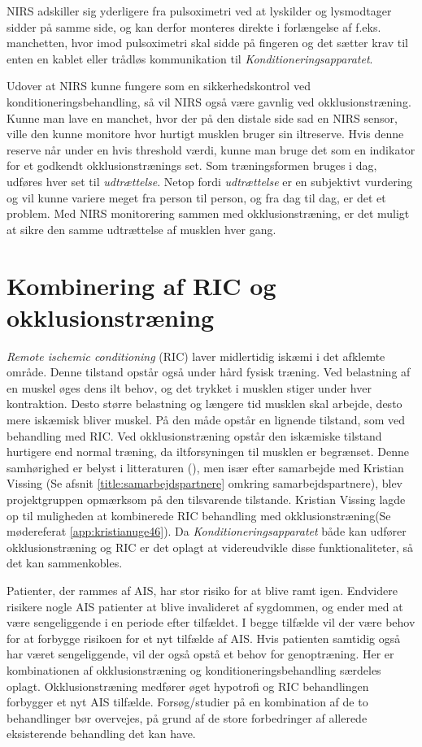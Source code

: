 NIRS adskiller sig yderligere fra pulsoximetri ved at lyskilder og lysmodtager sidder på samme side, og kan derfor monteres direkte i forlængelse af f.eks. manchetten, hvor imod pulsoximetri skal sidde på fingeren og det sætter krav til enten en kablet eller trådløs kommunikation til \textit{Konditioneringsapparatet}. 

Udover at NIRS kunne fungere som en sikkerhedskontrol ved konditioneringsbehandling, så vil NIRS også være gavnlig ved okklusionstræning. Kunne man lave en manchet, hvor der på den distale side sad en NIRS sensor, ville den kunne monitore hvor hurtigt musklen bruger sin iltreserve. Hvis denne reserve når under en hvis threshold værdi, kunne man bruge det som en indikator for et godkendt okklusionstrænings set. Som træningsformen bruges i dag, udføres hver set til \textit{udtrættelse}. Netop fordi \textit{udtrættelse} er en subjektivt vurdering og vil kunne variere meget fra person til person, og fra dag til dag, er det et problem. Med NIRS monitorering sammen med okklusionstræning, er det muligt at sikre den samme udtrættelse af musklen hver gang. 

\section{Kombinering af RIC og okklusionstræning} \label{title:kombRICogOkkl}
\textit{Remote ischemic conditioning} (RIC) laver midlertidig iskæmi i det afklemte område. Denne tilstand opstår også under hård fysisk træning. Ved belastning af en muskel øges dens ilt behov, og det trykket i musklen stiger under hver kontraktion. Desto større belastning og længere tid musklen skal arbejde, desto mere iskæmisk bliver muskel. På den måde opstår en lignende tilstand, som ved behandling med RIC. Ved okklusionstræning opstår den iskæmiske tilstand hurtigere end normal træning, da iltforsyningen til musklen er begrænset. Denne samhørighed er belyst i litteraturen (\cite{RefWorks:3}), men især efter samarbejde med Kristian Vissing (Se afsnit \ref{title:samarbejdspartnere} omkring samarbejdspartnere), blev projektgruppen opmærksom på den tilsvarende tilstande. Kristian Vissing lagde op til muligheden at kombinerede RIC behandling med okklusionstræning(Se mødereferat \ref{app:kristianuge46}). Da \textit{Konditioneringsapparatet} både kan udfører okklusionstræning og RIC er det oplagt at videreudvikle disse funktionaliteter, så det kan sammenkobles. 

Patienter, der rammes af AIS, har stor risiko for at blive ramt igen. Endvidere risikere nogle AIS patienter at blive invalideret af sygdommen, og ender med at være sengeliggende i en periode efter tilfældet. I begge tilfælde vil der være behov for at forbygge risikoen for et nyt tilfælde af AIS. Hvis patienten samtidig også har været sengeliggende, vil der også opstå et behov for genoptræning. Her er kombinationen af okklusionstræning og konditioneringsbehandling særdeles oplagt. Okklusionstræning medfører øget hypotrofi og RIC behandlingen forbygger et nyt AIS tilfælde. Forsøg/studier på en kombination af de to behandlinger bør overvejes, på grund af de store  forbedringer af allerede eksisterende behandling det kan have. 

